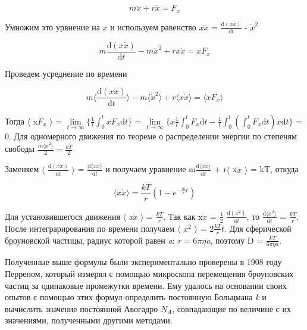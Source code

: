 \begin{equation}
	m\ddot{x} + r\dot{x} = F_x
\end{equation}

Умножим это урвнение на $x$ и используем равенство  $x$$\ddot{x}$ = $\frac{\mathrm{d}(x\dot{x})}{\mathrm{d}t}$ - $\dot{x}^2$

\begin{equation}
	m\frac{\mathrm{d}(x\dot{x})}{\mathrm{d}t} - m\dot{x}^2 + rx\dot{x} = xF_x
\end{equation}

Проведем усреднение по времени 

\begin{equation}
	m\langle \frac{\mathrm{d}(x\dot{x})}{\mathrm{d}t} \rangle - m\langle \dot{x}^2 \rangle + r\langle x\dot{x} \rangle = \langle xF_x \rangle
\end{equation}

Тогда $\langle$ x$F_x$ $\rangle$ = $\lim\limits_{t \to \infty} \{\frac{1}{t}\int_{0}^{t}xF_x\mathrm{d}t\}$ = $\lim\limits_{t \to \infty} \{x\frac{1}{t}\int_{0}^{t}F_x\mathrm{d}t-\frac{1}{t}\int_{0}^{t}(\int_{0}^{t}F_x\mathrm{d}t)\dot{x}\mathrm{d}t\}$ = 0. Для одномерного движения по теореме о распределении энергии по степеням свободы $\frac{m\langle \dot{x}^2 \rangle}{2} =\frac{kT}{2} $

Заменяем $\langle$ $\frac{\mathrm{d}(x\dot{x})}{\mathrm{d}t}$ $\rangle$ = $\frac{\mathrm{d}\langle x\dot{x} \rangle}{\mathrm{d}t}$ и получаем уравнение m$\frac{\mathrm{d}\langle x\dot{x} \rangle}{\mathrm{d}t}$ + r$\langle$ x$\dot{x}$ $\rangle$ = kT, откуда

\begin{equation}
	\langle x\dot{x} \rangle = \frac{kT}{r}(1 - e^{-\frac{m}{r}t})
\end{equation}

Для установившегося движения $\langle$ \textit{x}$\dot{x}$ $\rangle$ = $\frac{kT}{r}$. Так как x$\dot{x}$ = $\frac{1}{2}$ $\frac{\mathrm{d}(x^2)}{\mathrm{d}t}$, то $\frac{\mathrm{d}\langle x^2 \rangle}{\mathrm{d}t}$ = $\frac{kT}{r}$. После интеграрирования по времени получаем $\langle$ $x^2$ $\rangle$ = 2$\frac{kT}{r}t$. Для сферической броуновской частицы, радиус которой равен \textit{a}: \textit{r} = 6$\pi$$\eta$\textit{a}, поэтому D = $\frac{\textit{k}T}{6\pi\eta\textit{a}}$.

Полученные выше формулы были экспериментально проверены в 1908 году Перреном, который измерял с помощью микроскопа перемещения броуновских частиц за одинаковые промежутки времени. Ему удалось на основании своих опытов с помощью этих формул определить постоянную Больцмана \textit{k} и вычислить значение постоянной Авогадро $N_A$, совпадающие по величине с их значениями, полученными другими методами.


